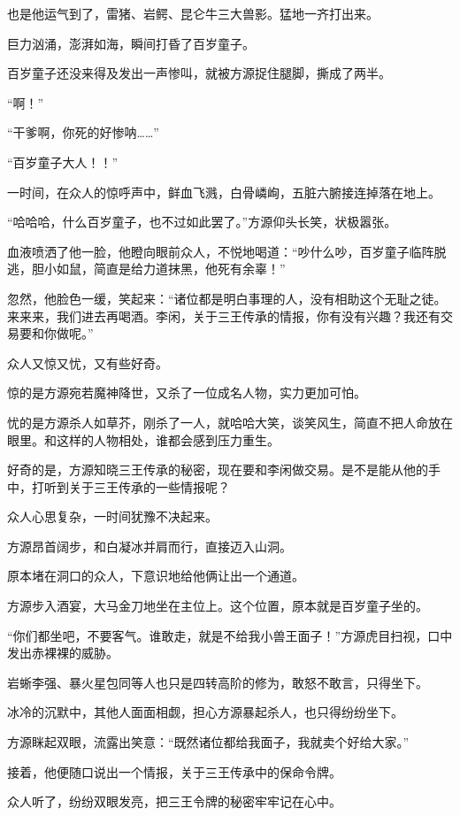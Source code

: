 \begin{this_body}
也是他运气到了，雷猪、岩鳄、昆仑牛三大兽影。猛地一齐打出来。

巨力汹涌，澎湃如海，瞬间打昏了百岁童子。

百岁童子还没来得及发出一声惨叫，就被方源捉住腿脚，撕成了两半。

“啊！”

“干爹啊，你死的好惨呐……”

“百岁童子大人！！”

一时间，在众人的惊呼声中，鲜血飞溅，白骨嶙峋，五脏六腑接连掉落在地上。

“哈哈哈，什么百岁童子，也不过如此罢了。”方源仰头长笑，状极嚣张。

血液喷洒了他一脸，他瞪向眼前众人，不悦地喝道：“吵什么吵，百岁童子临阵脱逃，胆小如鼠，简直是给力道抹黑，他死有余辜！”

忽然，他脸色一缓，笑起来：“诸位都是明白事理的人，没有相助这个无耻之徒。来来来，我们进去再喝酒。李闲，关于三王传承的情报，你有没有兴趣？我还有交易要和你做呢。”

众人又惊又忧，又有些好奇。

惊的是方源宛若魔神降世，又杀了一位成名人物，实力更加可怕。

忧的是方源杀人如草芥，刚杀了一人，就哈哈大笑，谈笑风生，简直不把人命放在眼里。和这样的人物相处，谁都会感到压力重生。

好奇的是，方源知晓三王传承的秘密，现在要和李闲做交易。是不是能从他的手中，打听到关于三王传承的一些情报呢？

众人心思复杂，一时间犹豫不决起来。

方源昂首阔步，和白凝冰并肩而行，直接迈入山洞。

原本堵在洞口的众人，下意识地给他俩让出一个通道。

方源步入酒宴，大马金刀地坐在主位上。这个位置，原本就是百岁童子坐的。

“你们都坐吧，不要客气。谁敢走，就是不给我小兽王面子！”方源虎目扫视，口中发出赤裸裸的威胁。

岩蜥李强、暴火星包同等人也只是四转高阶的修为，敢怒不敢言，只得坐下。

冰冷的沉默中，其他人面面相觑，担心方源暴起杀人，也只得纷纷坐下。

方源眯起双眼，流露出笑意：“既然诸位都给我面子，我就卖个好给大家。”

接着，他便随口说出一个情报，关于三王传承中的保命令牌。

众人听了，纷纷双眼发亮，把三王令牌的秘密牢牢记在心中。

\end{this_body}

